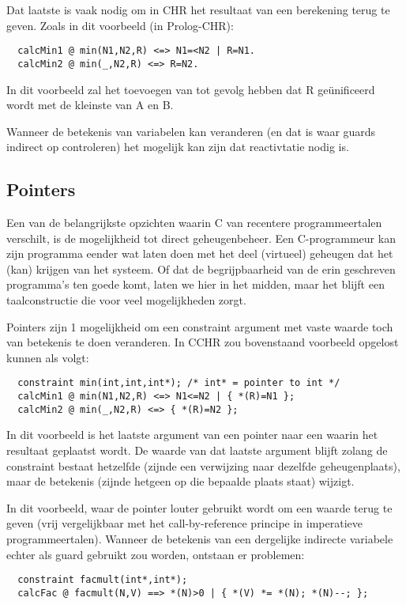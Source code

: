 Dat laatste is vaak nodig om in CHR het resultaat van een berekening terug te geven. Zoals in dit voorbeeld (in Prolog-CHR): \begin{Verbatim}
  calcMin1 @ min(N1,N2,R) <=> N1=<N2 | R=N1.
  calcMin2 @ min(_,N2,R) <=> R=N2.
\end{Verbatim}
In dit voorbeeld zal het toevoegen van  tot gevolg hebben dat R ge\"unificeerd wordt met de kleinste van A en B.

Wanneer de betekenis van variabelen kan veranderen (en dat is waar guards indirect op controleren) het mogelijk kan zijn dat
reactivtatie nodig is.

\subsection{Pointers}

Een van de belangrijkste opzichten waarin C van recentere programmeertalen verschilt, is de mogelijkheid tot direct geheugenbeheer. Een C-programmeur kan zijn programma eender wat laten doen met het deel (virtueel) geheugen dat het (kan) krijgen van het systeem. Of dat de begrijpbaarheid van de erin geschreven programma's ten goede komt, laten we hier in het midden, maar het blijft een taalconstructie die voor veel mogelijkheden zorgt.

Pointers zijn 1 mogelijkheid om een constraint argument met vaste waarde toch van betekenis te doen veranderen. In CCHR
zou bovenstaand voorbeeld opgelost kunnen als volgt: \begin{Verbatim}
  constraint min(int,int,int*); /* int* = pointer to int */
  calcMin1 @ min(N1,N2,R) <=> N1<=N2 | { *(R)=N1 };
  calcMin2 @ min(_,N2,R) <=> { *(R)=N2 };
\end{Verbatim}

In dit voorbeeld is het laatste argument van  een pointer naar een  waarin het resultaat geplaatst wordt. De
waarde van dat laatste argument blijft zolang de constraint bestaat hetzelfde (zijnde een verwijzing naar dezelfde
geheugenplaats), maar de betekenis (zijnde hetgeen op die bepaalde plaats staat) wijzigt.

In dit voorbeeld, waar de pointer louter gebruikt wordt om een waarde terug te geven (vrij vergelijkbaar met het call-by-reference principe in imperatieve programmeertalen). Wanneer de betekenis van een dergelijke indirecte variabele echter als guard gebruikt zou worden, ontstaan er problemen: \begin{Verbatim}
  constraint facmult(int*,int*);
  calcFac @ facmult(N,V) ==> *(N)>0 | { *(V) *= *(N); *(N)--; };
\end{Verbatim}

